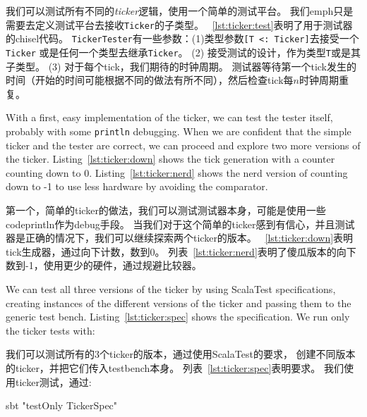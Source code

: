 \documentclass[%
    10pt,
    headinclude, footexclude,
    openright, %
    notitlepage,
    cleardoubleempty,
    headsepline,
    pointlessnumbers,
    bibtotoc, idxtotoc,
    ]{scrbook}
\newcommand{\code}[1]{{\small{\texttt{#1}}}}
\begin{document}
我们可以测试所有不同的\emph{ticker}逻辑，使用一个简单的测试平台。
我们emph{只是}需要去定义测试平台去接收\code{Ticker}的子类型。
~\ref{lst:ticker:test}表明了用于测试器的chisel代码。
\code{TickerTester}有一些参数：(1)类型参数\code{[T <: Ticker]}去接受一个\code{Ticker}
或是任何一个类型去继承\code{Ticker}。
(2) 接受测试的设计，作为类型\code{T}或是其子类型。
(3) 对于每个tick，我们期待的时钟周期。
测试器等待第一个tick发生的时间（开始的时间可能根据不同的做法有所不同），然后检查tick每$n$时钟周期重复。



With a first, easy implementation of the ticker, we can test the tester
itself, probably with some \code{println} debugging. When we are confident that
the simple ticker and the tester are correct, we can proceed and explore
two more versions of the ticker. Listing~\ref{lst:ticker:down} shows the tick
generation with a counter counting down to 0.
Listing~\ref{lst:ticker:nerd} shows the nerd version of counting down to -1 to use
less hardware by avoiding the comparator.

第一个，简单的ticker的做法，我们可以测试测试器本身，可能是使用一些code{println}作为debug手段。
当我们对于这个简单的ticker感到有信心，并且测试器是正确的情况下，我们可以继续探索两个ticker的版本。
~\ref{lst:ticker:down}表明tick生成器，通过向下计数，数到0。
列表~\ref{lst:ticker:nerd}表明了傻瓜版本的向下数到-1，使用更少的硬件，通过规避比较器。



We can test all three versions of the ticker by using ScalaTest specifications,
creating instances of the different versions of the ticker and passing them
to the generic test bench. Listing~\ref{lst:ticker:spec} shows the specification.
We run only the ticker tests with:

我们可以测试所有的3个ticker的版本，通过使用ScalaTest的要求，
创建不同版本的ticker，并把它们传入testbench本身。
列表~\ref{lst:ticker:spec}表明要求。
我们使用ticker测试，通过:

\begin{chisel}
sbt "testOnly TickerSpec"
\end{chisel}

\end{document}
